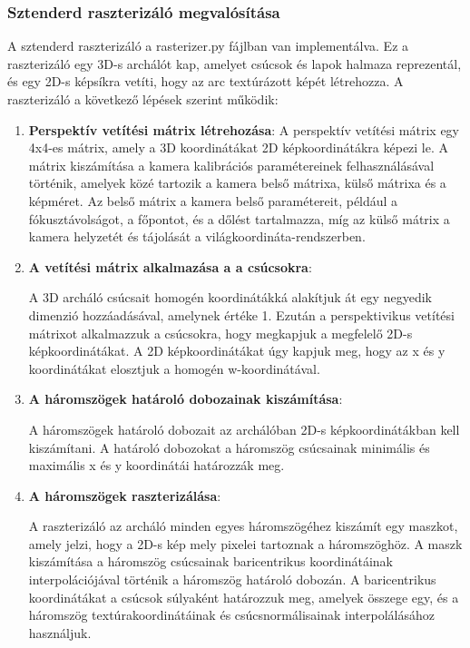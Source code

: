 \documentclass[12pt,a4]{article}
\begin{document}
\subsubsection{Sztenderd raszterizáló megvalósítása}
A sztenderd raszterizáló a rasterizer.py fájlban van implementálva.
 Ez a raszterizáló egy 3D-s archálót kap, amelyet csúcsok és lapok halmaza reprezentál, és egy 2D-s képsíkra vetíti, hogy az arc textúrázott képét létrehozza.
 A raszterizáló a következő lépések szerint működik:
 \begin{enumerate}
     \item \textbf{Perspektív vetítési mátrix létrehozása}:
     A perspektív vetítési mátrix egy 4x4-es mátrix, amely a 3D koordinátákat 2D képkoordinátákra képezi le. 
	A mátrix kiszámítása a kamera kalibrációs paramétereinek felhasználásával történik, amelyek közé tartozik a kamera belső mátrixa, külső mátrixa és a képméret. 
Az belső mátrix a kamera belső paramétereit, például a fókusztávolságot, a főpontot, 
és a dőlést tartalmazza, míg az külső mátrix a kamera helyzetét és tájolását a világkoordináta-rendszerben.
     \item \textbf{A vetítési mátrix alkalmazása a a csúcsokra}:
     
     A 3D archáló csúcsait homogén koordinátákká alakítjuk át egy negyedik dimenzió hozzáadásával, amelynek értéke 1. 
	Ezután a perspektivikus vetítési mátrixot alkalmazzuk a csúcsokra, hogy megkapjuk a megfelelő 2D-s képkoordinátákat. 
	A 2D képkoordinátákat úgy kapjuk meg, hogy az x és y koordinátákat elosztjuk a homogén w-koordinátával.
 
     \item \textbf{A háromszögek határoló dobozainak kiszámítása}:
     
     A háromszögek határoló dobozait az archálóban 2D-s képkoordinátákban kell kiszámítani.
	A határoló dobozokat a háromszög csúcsainak minimális és maximális x és y koordinátái határozzák meg.
 
     \item \textbf{A háromszögek raszterizálása}:
     
     A raszterizáló az archáló minden egyes háromszögéhez kiszámít egy maszkot, amely jelzi, hogy a 2D-s kép mely pixelei tartoznak a háromszöghöz. 
A maszk kiszámítása a háromszög csúcsainak baricentrikus koordinátáinak interpolációjával történik a háromszög határoló dobozán.
	A baricentrikus koordinátákat a csúcsok súlyaként határozzuk meg, amelyek összege egy, és a háromszög textúrakoordinátáinak és csúcsnormálisainak interpolálásához használjuk.
 

\end{enumerate}
\end{document}
